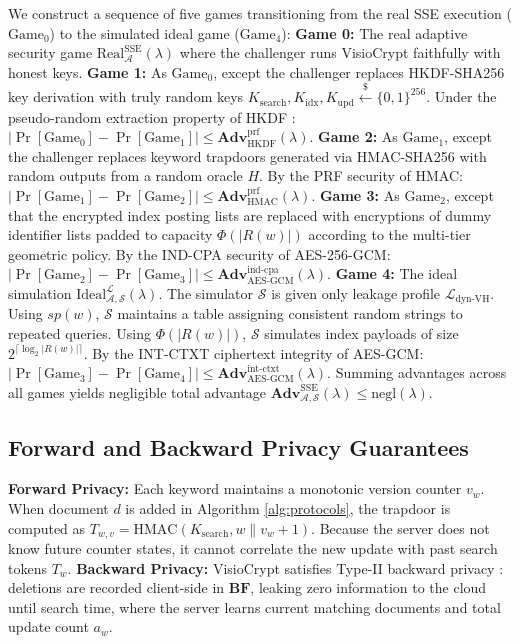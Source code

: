 \documentclass[10pt,conference]{IEEEtran}
\begin{document}
\begin{IEEEproof}
We construct a sequence of five games transitioning from the real SSE execution ($\text{Game}_0$) to the simulated ideal game ($\text{Game}_4$):
\textbf{Game 0:} The real adaptive security game $\text{Real}_{\mathcal{A}}^{\text{SSE}}(\lambda)$ where the challenger runs VisioCrypt faithfully with honest keys.
\textbf{Game 1:} As $\text{Game}_0$, except the challenger replaces HKDF-SHA256 key derivation with truly random keys $K_{\text{search}}, K_{\text{idx}}, K_{\text{upd}} \xleftarrow{\$} \{0,1\}^{256}$. Under the pseudo-random extraction property of HKDF \cite{rfc5869}: $|\Pr[\text{Game}_0] - \Pr[\text{Game}_1]| \le \mathbf{Adv}_{\text{HKDF}}^{\text{prf}}(\lambda)$.
\textbf{Game 2:} As $\text{Game}_1$, except the challenger replaces keyword trapdoors generated via HMAC-SHA256 with random outputs from a random oracle $H$. By the PRF security of HMAC: $|\Pr[\text{Game}_1] - \Pr[\text{Game}_2]| \le \mathbf{Adv}_{\text{HMAC}}^{\text{prf}}(\lambda)$.
\textbf{Game 3:} As $\text{Game}_2$, except that the encrypted index posting lists are replaced with encryptions of dummy identifier lists padded to capacity $\Phi(|R(w)|)$ according to the multi-tier geometric policy. By the IND-CPA security of AES-256-GCM: $|\Pr[\text{Game}_2] - \Pr[\text{Game}_3]| \le \mathbf{Adv}_{\text{AES-GCM}}^{\text{ind-cpa}}(\lambda)$.
\textbf{Game 4:} The ideal simulation $\text{Ideal}_{\mathcal{A},\mathcal{S}}^{\mathcal{L}}(\lambda)$. The simulator $\mathcal{S}$ is given only leakage profile $\mathcal{L}_{\text{dyn-VH}}$. Using $sp(w)$, $\mathcal{S}$ maintains a table assigning consistent random strings to repeated queries. Using $\Phi(|R(w)|)$, $\mathcal{S}$ simulates index payloads of size $2^{\lceil \log_2 |R(w)| \rceil}$. By the INT-CTXT ciphertext integrity of AES-GCM: $|\Pr[\text{Game}_3] - \Pr[\text{Game}_4]| \le \mathbf{Adv}_{\text{AES-GCM}}^{\text{int-ctxt}}(\lambda)$.
Summing advantages across all games yields negligible total advantage $\mathbf{Adv}_{\mathcal{A},\mathcal{S}}^{\text{SSE}}(\lambda) \le \text{negl}(\lambda)$.
\end{IEEEproof}

\subsection{Forward and Backward Privacy Guarantees}
\textbf{Forward Privacy:} Each keyword maintains a monotonic version counter $v_w$. When document $d$ is added in Algorithm \ref{alg:protocols}, the trapdoor is computed as $T_{w,v} = \text{HMAC}(K_{\text{search}}, w \parallel v_w + 1)$. Because the server does not know future counter states, it cannot correlate the new update with past search tokens $T_w$.
\textbf{Backward Privacy:} VisioCrypt satisfies Type-II backward privacy \cite{bost2017diana}: deletions are recorded client-side in $\mathbf{BF}$, leaking zero information to the cloud until search time, where the server learns current matching documents and total update count $a_w$.
\end{document}

